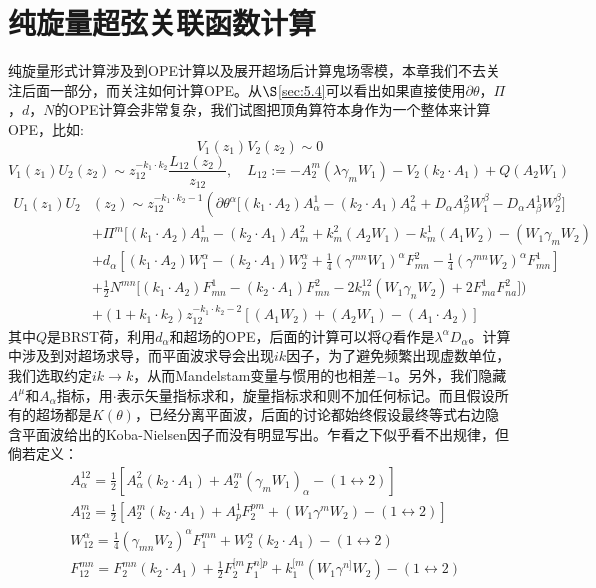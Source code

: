 \section{纯旋量超弦关联函数计算}
纯旋量形式计算涉及到OPE计算以及展开超场后计算鬼场零模，本章我们不去关注后面一部分，而关注如何计算OPE。从$\S$\ref{sec:5.4}可以看出如果直接使用$\partial\theta$，$\Pi$，$d$，$N$的OPE计算会非常复杂，我们试图把顶角算符本身作为一个整体来计算OPE，比如:
\begin{equation}
	V_1(z_1)V_2(z_2)\sim 0
\end{equation}
\begin{equation}
	\label{eq:6.17}
	V_1(z_1)U_2(z_2)\sim z_{12}^{-k_1\cdot k_2}\frac{L_{12}(z_2)}{z_{12}},\quad L_{12}:=-A_2^m(\lambda\gamma_mW_1)-V_2(k_2\cdot A_1)+Q(A_2W_1)
\end{equation}
\begin{equation}
	\label{eq:6.18}
	\begin{aligned}
		U_1(z_1)U_2&(z_2)\sim z_{12}^{-k_1\cdot k_2-1}\left(\partial\theta^\alpha\Big[(k_1\cdot A_2)A_\alpha^1-(k_2\cdot A_1)A_\alpha^2+D_\alpha A_\beta^2W_1^\beta-D_\alpha A_\beta^1W_2^\beta\Big]\right.\\&+\Pi^m\Big[(k_1\cdot A_2)A_m^1-(k_2\cdot A_1)A_m^2+k_m^2(A_2W_1)-k_m^1(A_1W_2)-(W_1\gamma_mW_2)\\&+d_\alpha\left[(k_1\cdot A_2)W_1^\alpha-(k_2\cdot A_1)W_2^\alpha+\frac14(\gamma^{mn}W_1)^\alpha F_{mn}^2-\frac14(\gamma^{mn}W_2)^\alpha F_{mn}^1\right]\\&+\frac12N^{mn}\Big[(k_1\cdot A_2)F_{mn}^1-(k_2\cdot A_1)F_{mn}^2-2k_m^{12}(W_1\gamma_nW_2)+2F_{ma}^1F_{na}^2\Big]\Big)\\&+(1+k_1\cdot k_2)z_{12}^{-k_1\cdot k_2-2}\left[(A_1W_2)+(A_2W_1)-(A_1\cdot A_2)\right]
	\end{aligned}
\end{equation}
其中$Q$是BRST荷，利用$d_\alpha$和超场的OPE，后面的计算可以将$Q$看作是$\lambda^\alpha D_\alpha$。计算中涉及到对超场求导，而平面波求导会出现$ik$因子，为了避免频繁出现虚数单位，我们选取约定$ik\to k$，从而Mandelstam变量与惯用的也相差$-1$。另外，我们隐藏$A^\mu$和$A_\alpha$指标，用$\cdot$表示矢量指标求和，旋量指标求和则不加任何标记。而且假设所有的超场都是$K(\theta)$，已经分离平面波，后面的讨论都始终假设最终等式右边隐含平面波给出的Koba-Nielsen因子而没有明显写出。乍看之下似乎看不出规律，但倘若定义：
\begin{equation}
	\label{eq:6.19}
	\begin{aligned}
		&A_\alpha^{12}=\frac{1}{2}\left[A_\alpha^2(k_2\cdot A_1)+A_2^m(\gamma_mW_1)_\alpha-(1\leftrightarrow2)\right]
		\\&A_{12}^m=\frac{1}{2}\left[A_2^m(k_2\cdot A_1)+A_p^1F_2^{pm}+(W_1\gamma^mW_2)-(1\leftrightarrow2)\right]
		\\&W_{12}^{\alpha}=\frac{1}{4}(\gamma_{mn}W_2)^\alpha F_1^{mn}+W_2^\alpha(k_2\cdot A_1)-(1\leftrightarrow2)
		\\&F_{12}^{mn}=F_2^{mn}(k_2\cdot A_1)+\frac{1}{2}F_2^{[m}F_1^{n]p}+k_1^{[m}(W_1\gamma^{n]}W_2)-(1\leftrightarrow2)
	\end{aligned}
\end{equation}
